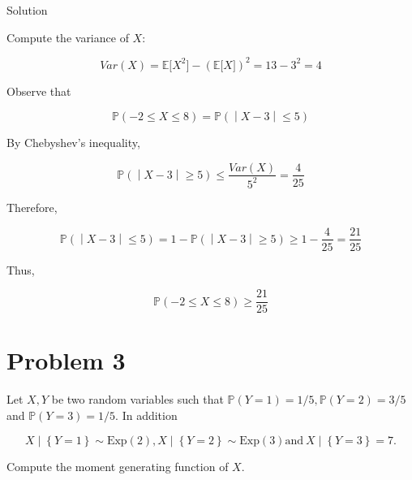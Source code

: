 \documentclass{qlnotes-export}
\begin{document}
\begin{qlsolution}{Solution}

Compute the variance of \(X\):

\[Var(X) = {\mathbb{E}}\lbrack X^{2}\rbrack - ({\mathbb{E}}\lbrack X\rbrack)^{2} = 13 - 3^{2} = 4\]

Observe that

\[\left. {\mathbb{P}}( - 2 \leq X \leq 8) = {\mathbb{P}}( \middle| X - 3 \middle| \leq 5) \right.\]

By Chebyshev's inequality,

\[\left. {\mathbb{P}}( \middle| X - 3 \middle| \geq 5) \leq \frac{Var(X)}{5^{2}} = \frac{4}{25} \right.\]

Therefore,

\[\left. {\mathbb{P}}( \middle| X - 3 \middle| \leq 5) = 1 - {\mathbb{P}}( \middle| X - 3 \middle| \geq 5) \geq 1 - \frac{4}{25} = \frac{21}{25} \right.\]

Thus,

\[{\mathbb{P}}( - 2 \leq X \leq 8) \geq \frac{21}{25}\]

\end{qlsolution}

\section{Problem 3}\label{problem-3-4}

Let \(X,Y\) be two random variables such that \({\mathbb{P}}(Y = 1) = 1/5,{\mathbb{P}}(Y = 2) = 3/5\) and \({\mathbb{P}}(Y = 3) = 1/5\). In addition

\[\left. X \middle| \left\{ {Y = 1} \right\} \sim \text{Exp}(2),X \middle| \left\{ {Y = 2} \right\} \sim \text{Exp}(3)\text{and}\ X \mid \left\{ {Y = 3} \right\} = 7. \right.\]

Compute the moment generating function of \(X\).
\end{document}
